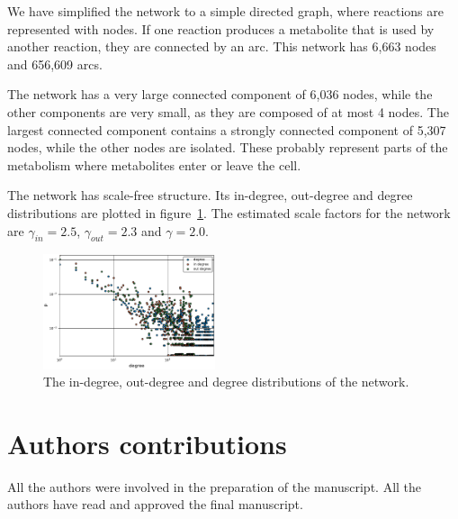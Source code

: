 We have simplified the network to a simple directed graph, where reactions are
represented with nodes. If one reaction produces a metabolite that is used by
another reaction, they are connected by an arc. This network has 6,663 nodes and
656,609 arcs.

The network has a very large connected component of 6,036 nodes, while the other
components are very small, as they are composed of at most 4 nodes. The largest
connected component contains a strongly connected component of 5,307 nodes,
while the other nodes are isolated. These probably represent parts of the
metabolism where metabolites enter or leave the cell.

The network has scale-free structure. Its in-degree, out-degree and degree
distributions are plotted in figure~\ref{fig:dist}. The estimated scale factors
for the network are $\gamma_{in} = 2.5$, $\gamma_{out} = 2.3$ and $\gamma =
2.0$. %

\begin{figure}
  \includegraphics[width=0.45\textwidth]{../plots/degree}
  \caption{The in-degree, out-degree and degree distributions of the network.}
  \label{fig:dist}
\end{figure}

\section{Authors contributions}
All the authors were involved in the preparation of the manuscript.
All the authors have read and approved the final manuscript.








